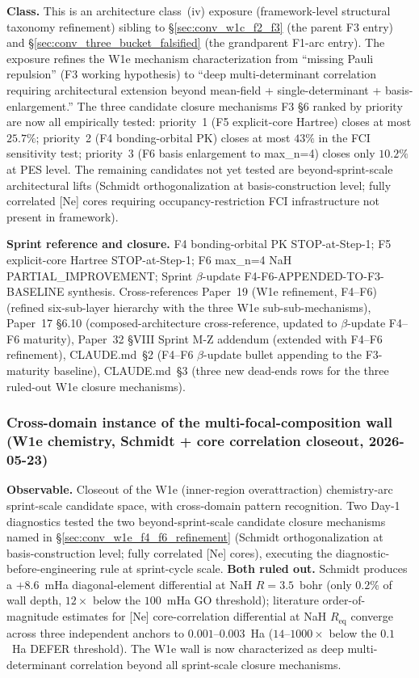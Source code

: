 \documentclass[11pt]{article}
\begin{document}
\textbf{Class.} This is an architecture class~(iv) exposure
(framework-level structural taxonomy refinement) sibling to
\S\ref{sec:conv_w1c_f2_f3} (the parent F3 entry) and
\S\ref{sec:conv_three_bucket_falsified} (the grandparent F1-arc
entry). The exposure refines the W1e mechanism characterization from
``missing Pauli repulsion'' (F3 working hypothesis) to ``deep
multi-determinant correlation requiring architectural extension
beyond mean-field + single-determinant + basis-enlargement.'' The
three candidate closure mechanisms F3 §6 ranked by priority are now
all empirically tested: priority~1 (F5 explicit-core Hartree) closes
at most $25.7\%$; priority~2 (F4 bonding-orbital PK) closes at most
$43\%$ in the FCI sensitivity test; priority~3 (F6 basis enlargement
to max\_n=4) closes only $10.2\%$ at PES level. The remaining
candidates not yet tested are beyond-sprint-scale architectural lifts
(Schmidt orthogonalization at basis-construction level; fully
correlated [Ne] cores requiring occupancy-restriction FCI
infrastructure not present in framework).

\textbf{Sprint reference and closure.} F4 bonding-orbital PK
STOP-at-Step-1; F5 explicit-core
Hartree STOP-at-Step-1; F6 max\_n=4
NaH PARTIAL\_IMPROVEMENT; Sprint
$\beta$-update F4-F6-APPENDED-TO-F3-BASELINE synthesis.
Cross-references Paper~19 (W1e refinement, F4--F6)
(refined six-sub-layer hierarchy with the three W1e
sub-sub-mechanisms), Paper~17 \S6.10 (composed-architecture
cross-reference, updated to $\beta$-update F4--F6 maturity),
Paper~32 \S VIII Sprint M-Z addendum (extended with F4--F6 refinement),
CLAUDE.md~\S2 (F4--F6 $\beta$-update bullet appending to the
F3-maturity baseline), CLAUDE.md~\S3 (three new dead-ends rows
for the three ruled-out W1e closure mechanisms).

\subsubsection{Cross-domain instance of the multi-focal-composition wall (W1e chemistry, Schmidt + core correlation closeout, 2026-05-23)}
\label{sec:conv_w1e_cross_domain_wall}

\textbf{Observable.} Closeout of the W1e (inner-region overattraction)
chemistry-arc sprint-scale candidate space, with cross-domain pattern
recognition. Two Day-1 diagnostics tested the two beyond-sprint-scale
candidate
closure mechanisms named in \S\ref{sec:conv_w1e_f4_f6_refinement}
(Schmidt orthogonalization at basis-construction level; fully
correlated [Ne] cores), executing the diagnostic-before-engineering
rule at sprint-cycle scale. \textbf{Both ruled out.} Schmidt produces
a $+8.6$~mHa diagonal-element differential at NaH $R = 3.5$~bohr
(only $0.2\%$ of wall depth, $12\times$ below the $100$~mHa GO
threshold); literature order-of-magnitude estimates for [Ne]
core-correlation differential at NaH $R_\text{eq}$ converge across
three independent anchors to $0.001$--$0.003$~Ha
($14$--$1000\times$ below the $0.1$~Ha DEFER threshold). The W1e
wall is now characterized as deep multi-determinant correlation
beyond all sprint-scale closure mechanisms.
\end{document}
